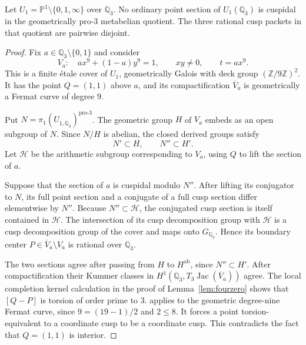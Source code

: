\begin{proposition}
\label{prop:lm-local-metabelian-separation}
Let $U_1=\mathbb P^1\setminus\{0,1,\infty\}$ over
$\mathbb Q_3$.  No ordinary point section of $U_1(\mathbb Q_3)$
is cuspidal in the geometrically pro-$3$ metabelian quotient.
The three rational cusp packets in that quotient are pairwise
disjoint.
\end{proposition}
\begin{proof}
Fix $a\in\mathbb Q_3\setminus\{0,1\}$ and consider
\[
 V_a:\quad a x^9+(1-a)y^9=1,\qquad xy\ne0,
 \qquad t=a x^9.
\]
This is a finite \'etale cover of $U_1$, geometrically Galois
with deck group $(\mathbb Z/9\mathbb Z)^2$.  It has the point
$Q=(1,1)$ above $a$, and its compactification $\overline V_a$
is geometrically a Fermat curve of degree $9$.

Put $N=\pi_1(U_{1,\overline{\mathbb Q}_3})^{\mathrm{pro}\text{-}3}$.
The geometric group $H$ of $V_a$ embeds as an open subgroup of
$N$.  Since $N/H$ is abelian, the closed derived groups satisfy
\[
 N'\subset H,\qquad N''\subset H'.
\]
Let $\mathcal H$ be the arithmetic subgroup corresponding to
$V_a$, using $Q$ to lift the section of $a$.

Suppose that the section of $a$ is cuspidal modulo $N''$.
After lifting its conjugator to $N$, its full point section
and a conjugate of a full cusp section differ elementwise by
$N''$.  Because $N''\subset\mathcal H$, the conjugated cusp
section is itself contained in $\mathcal H$.  The intersection
of its cusp decomposition group with $\mathcal H$ is a cusp
decomposition group of the cover and maps onto
$G_{\mathbb Q_3}$.  Hence its boundary center
$P\in\overline V_a\setminus V_a$ is rational over
$\mathbb Q_3$.

The two sections agree after passing from $H$ to $H^{\mathrm{ab}}$,
since $N''\subset H'$.  After compactification their Kummer
classes in $H^1(\mathbb Q_3,T_3\operatorname{Jac}(\overline V_a))$
agree.  The local completion kernel calculation in the proof of Lemma~\ref{lem:fourzero} shows that
$[Q-P]$ is torsion of order prime to $3$.  \citet[Theorem~A, p.~191]{Coleman1986} applies to the geometric degree-nine Fermat curve,
since $9=(19-1)/2$ and $2\le8$.  It forces a point
torsion-equivalent to a coordinate cusp to be a coordinate
cusp.  This contradicts the fact that $Q=(1,1)$ is interior.


\end{proof}
